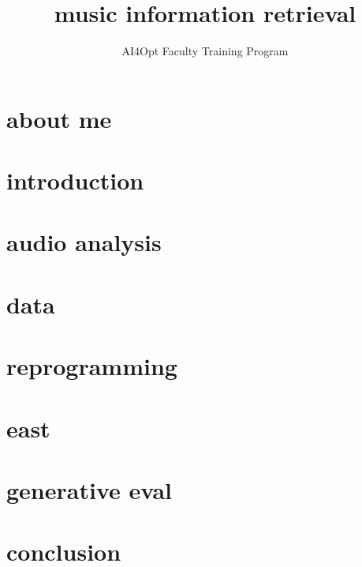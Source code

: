 

\title{music information retrieval}
\subtitle{AI4Opt Faculty Training Program} 


	

    \section[about]{about me}
        
        
    \section[intro]{introduction}
        
        
    \section{audio analysis}        
		
        
    \section{data}
        
    
    \section{reprogramming}
        
    
    \section{east}
        
    
    \section{generative eval}
        

    \section{conclusion}
        
        



